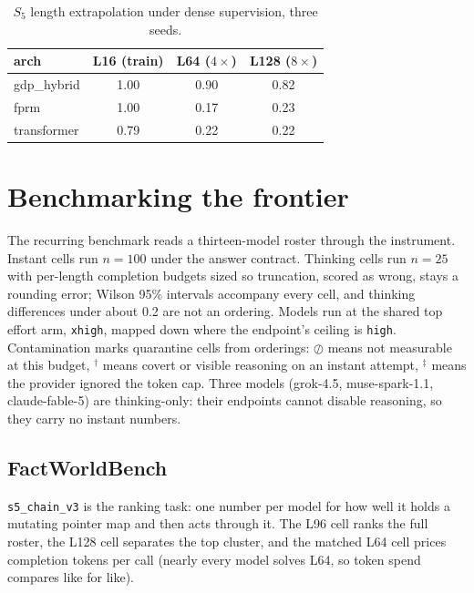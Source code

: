 \documentclass[11pt]{article}
\newcommand{\markdag}{$^{\dagger}$}
\newcommand{\markddag}{$^{\ddagger}$}
\newcommand{\censored}{$\oslash$}
\newcommand{\Sfive}{$S_5$}
\newcommand{\code}[1]{\texttt{#1}}
\begin{document}
\begin{table}[h]
\centering
\begin{tabular}{lccc}
\toprule
arch & L16 (train) & L64 ($4\times$) & L128 ($8\times$) \\
\midrule
gdp\_hybrid & 1.00 & 0.90 & 0.82 \\
fprm & 1.00 & 0.17 & 0.23 \\
transformer & 0.79 & 0.22 & 0.22 \\
\bottomrule
\end{tabular}
\caption{\Sfive{} length extrapolation under dense supervision, three seeds.}
\label{tab:s5extrap}
\end{table}

\section{Benchmarking the frontier}

The recurring benchmark reads a thirteen-model roster through the instrument. Instant cells
run $n=100$ under the answer contract. Thinking cells run $n=25$ with per-length completion
budgets sized so truncation, scored as wrong, stays a rounding error; Wilson 95\% intervals
accompany every cell, and thinking differences under about 0.2 are not an ordering. Models run
at the shared top effort arm, \code{xhigh}, mapped down where the endpoint's ceiling is
\code{high}. Contamination marks quarantine cells from orderings: \censored{} means not
measurable at this budget, \markdag{} means covert or visible reasoning on an instant attempt,
\markddag{} means the provider ignored the token cap. Three models (grok-4.5, muse-spark-1.1,
claude-fable-5) are thinking-only: their endpoints cannot disable reasoning, so they carry no
instant numbers.

\subsection{FactWorldBench}

\code{s5\_chain\_v3} is the ranking task: one number per model for how well it holds a
mutating pointer map and then acts through it. The L96 cell ranks the full roster, the L128
cell separates the top cluster, and the matched L64 cell prices completion tokens per call
(nearly every model solves L64, so token spend compares like for like).
\end{document}
